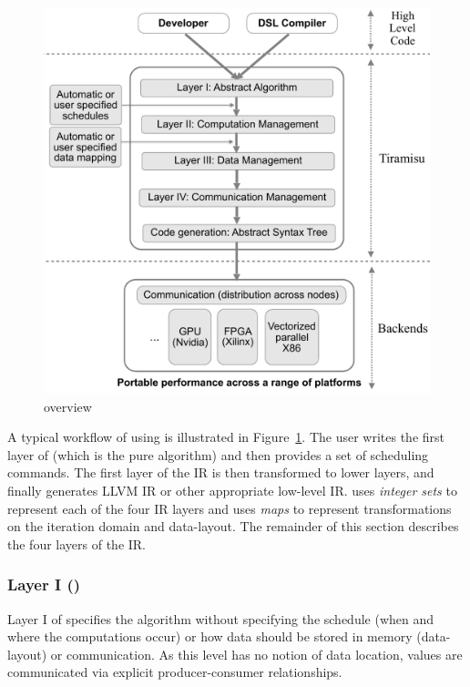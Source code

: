 \begin{figure}
 \includegraphics[scale=0.28]{./figures/fista.pdf}
 \vspace{-0.25cm}
 \caption{\framework overview}
 \label{fig:overview}
 \vspace{-0.5cm}
\end{figure}

A typical workflow of using \framework is illustrated in Figure~\ref{fig:overview}.  The user writes the first layer of \framework{} (which is the pure algorithm) and then provides a set of scheduling commands.  The first layer of the IR is then transformed to lower layers, and finally \framework{} generates LLVM IR or other appropriate low-level IR.
\framework{} uses \emph{integer sets} to represent each of the four IR layers and uses \emph{maps} to represent transformations on the iteration domain and data-layout.
The remainder of this section describes the four layers of the \framework IR.

\vspace{-0.25cm}
\subsubsection{Layer I (\Layerone)}
\label{layer1}

Layer I of \framework{} specifies the algorithm without specifying the schedule (when and where the computations occur) or how data should be stored in memory (data-layout) or communication. As this level has no notion of data location, values are communicated via explicit producer-consumer relationships.

